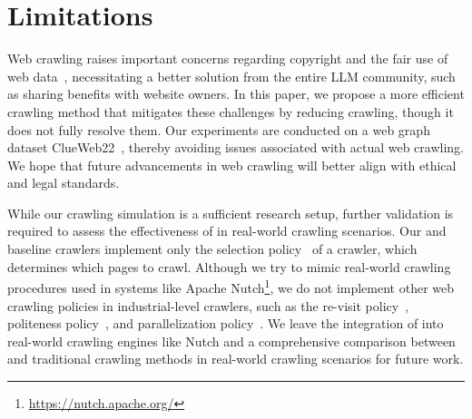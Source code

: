\section*{Limitations}

Web crawling raises important concerns regarding copyright and the fair use of web data~\citep{longpre2024consent}, necessitating a better solution from the entire LLM community, such as sharing benefits with website owners.
In this paper, we propose a more efficient crawling method that mitigates these challenges by reducing crawling, though it does not fully resolve them. 
Our experiments are conducted on a web graph dataset ClueWeb22~\citep{clueweb22}, thereby avoiding issues associated with actual web crawling. 
We hope that future advancements in web crawling will better align with ethical and legal standards.

While our crawling simulation is a sufficient research setup, further validation is required to assess the effectiveness of \ours{} in real-world crawling scenarios.  
Our \ours{} and baseline crawlers implement only the selection policy~\citep{pr-crawl} of a crawler, which determines which pages to crawl.  
Although we try to mimic real-world crawling procedures used in systems like Apache Nutch\footnote{\url{https://nutch.apache.org/}}, we do not implement other web crawling policies in industrial-level crawlers, such as the re-visit policy~\citep{revisit}, politeness policy~\citep{politeness}, and parallelization policy~\citep{parallelization}.  
We leave the integration of \ours{} into real-world crawling engines like Nutch and a comprehensive comparison between \ours{} and traditional crawling methods in real-world crawling scenarios for future work.
